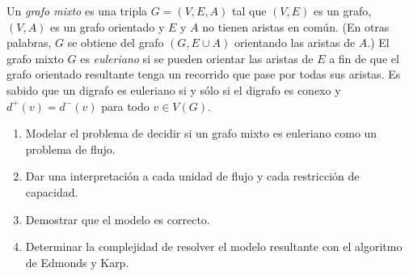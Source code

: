 

 
 \item Un \emph{grafo mixto} es una tripla $G = (V, E, A)$ tal que $(V, E)$ es un grafo, $(V, A)$ es un grafo orientado  y $E$ y $A$ no tienen aristas en común. (En otras palabras, $G$ se obtiene del grafo $(G, E \cup A)$ orientando las aristas de $A$.)  El grafo mixto $G$ es \emph{euleriano} si se pueden orientar las aristas de $E$ a fin de que el grafo orientado resultante tenga un recorrido que pase por todas sus aristas.  Es sabido que un digrafo es euleriano si y sólo si el digrafo es conexo y $d^+(v) = d^-(v)$ para todo $v \in V(G)$.  
 \begin{enumerate}[label=$\alph*)$,ref=$\alph*)$]
  \item Modelar el problema de decidir si un grafo mixto es euleriano como un problema de flujo.
  \item Dar una interpretación a cada unidad de flujo y cada restricción de capacidad.
  \item Demostrar que el modelo es correcto.
  \item Determinar la complejidad de resolver el modelo resultante con el algoritmo de Edmonds y Karp.
 \end{enumerate}


